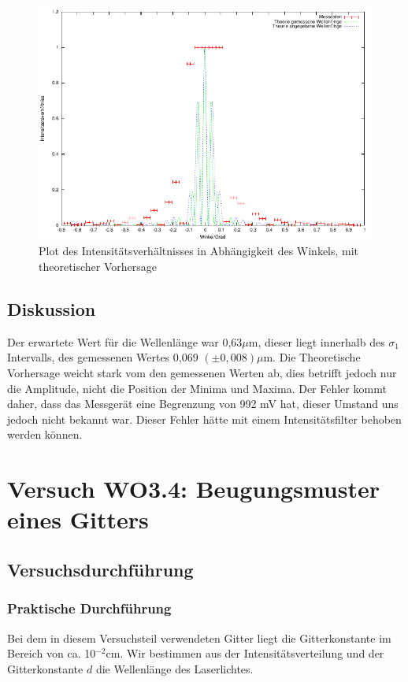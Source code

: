 \documentclass[12pt]{scrartcl}
\begin{document}
\begin{figure}[H]
\centering
    \includegraphics[scale = 1]{a_3.pdf}
  	\caption[Plot des Intensitätsverhältnisses in Abhängigkeit des Winkels, mit theoretischer Vorhersage]{Plot des Intensitätsverhältnisses in Abhängigkeit des Winkels, mit theoretischer Vorhersage}
  \label{fig:a_3}
\end{figure}


\subsection{Diskussion}
Der erwartete Wert für die Wellenlänge war 0,63$\mu$m, dieser liegt innerhalb des $\sigma_1$ Intervalls, des gemessenen Wertes 0,069 $(\pm 0,008) \mu$m. Die Theoretische Vorhersage weicht stark vom den gemessenen Werten ab, dies betrifft jedoch nur die Amplitude, nicht die Position der Minima und Maxima. Der Fehler kommt daher, dass das Messgerät eine Begrenzung von 992 mV hat, dieser Umstand uns jedoch nicht bekannt war. Dieser Fehler hätte mit einem Intensitätsfilter behoben werden können.

\section{Versuch WO3.4: Beugungsmuster eines Gitters}
\subsection{Versuchsdurchführung}

\subsubsection{Praktische Durchführung}
Bei dem in diesem Versuchsteil verwendeten Gitter liegt die Gitterkonstante im Bereich von ca. 10$^{-2}$cm. Wir bestimmen aus der Intensitätsverteilung und der Gitterkonstante $d$ die Wellenlänge des Laserlichtes.
\end{document}

